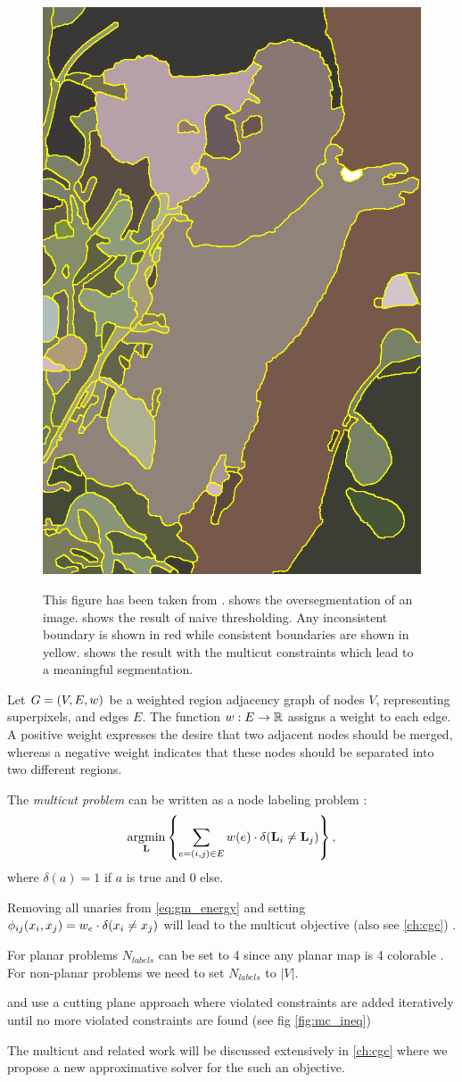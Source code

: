 \begin{figure}[h]
{{            \protect\includegraphics[width=.075\linewidth]{fig/andres/2.png} 
        }%
    }%
    \caption[Naive thresholding vs. multicuts]{
    This figure has been taken from \cite{andres_2011_iccv} .
     shows the oversegmentation of 
    an image.
     shows the result of naive thresholding.
    Any inconsistent boundary is shown in red while consistent
    boundaries are shown in yellow. 
     shows the result with the multicut
    constraints which lead to a meaningful segmentation.
    } \label{fig:naive_thresholding}
\end{figure}



Let $G=(V,E, w)$ be a weighted region adjacency graph of
nodes $V$, representing superpixels,
and edges $E$.
%
The function $w : E \rightarrow \mathbb{R}$ assigns a weight to each edge.
A positive weight expresses the desire that two adjacent nodes should
be merged, whereas a negative weight indicates
that these nodes should be separated into two different regions.


The \emph{multicut problem} can be written as a node labeling problem
\cite{bagon_2011_arxiv}:
%
\begin{align}
\operatorname*{\arg\!\min}_{\mathbf{L}}
    \left\{
    \sum_{ e=(i,j) \in E}
        w(e)
        \cdot \delta( \mathbf{L}_i \neq \mathbf{L}_j )
    \right\},
    \label{eq:multicut_primal_a}
\end{align}
%
where $\delta(a) = 1$ if $a$ is true and $0$ else.


Removing all unaries from \cref{eq:gm_energy} and 
setting $\phi_{ij}(x_i,x_j) =   w_e \cdot \delta( x_i \neq x_j )$ 
will lead to the multicut objective (also see \cref{ch:cgc}) .

For planar problems  $N_{labels}$ can be set to 4 since any planar map is 4 colorable \citep{appel_1977_4color}.
For non-planar problems we need to set $N_{labels}$ to $|V|$.


\citet{andres_2011_iccv} and \citet{kappes_2011_emmcvpr} use a
cutting plane approach where violated constraints are added
iteratively until no more violated constraints are found (see fig \cref{fig:mc_ineq})

The multicut and related work will be discussed extensively in \cref{ch:cgc} where
we propose a new approximative solver for the such an objective.


